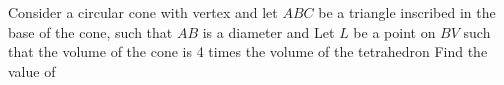 Consider a circular cone with vertex  and let $ ABC$ be a triangle inscribed in the base of the cone, such that $ AB$ is a diameter and  Let $ L$ be a point on $ BV$ such that the volume of the cone is 4 times the volume of the tetrahedron  Find the value of 